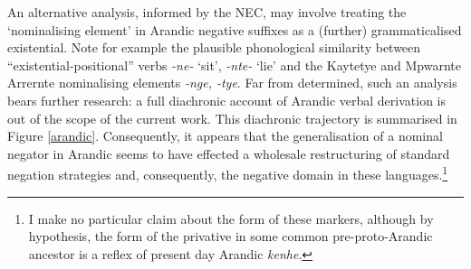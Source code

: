 \documentclass[usenames,dvipsnames,11pt]{article}
\begin{document}
{{	An alternative analysis, informed by the NEC, may involve treating the `nominalising element' in Arandic negative suffixes as a (further) grammaticalised existential. Note for example the plausible phonological similarity between ``existential-positional'' verbs \textit{-ne-} `sit', \textit{-nte-} `lie' and the Kaytetye and Mpwarnte Arrernte nominalising elements \textit{-nge, -tye}. Far from determined, such an analysis bears further research: a full diachronic account of Arandic verbal derivation is out of the scope of the current work.} This diachronic trajectory is summarised in Figure \ref{arandic}. %
Consequently, it appears that the generalisation of a nominal negator in Arandic seems to have effected a wholesale restructuring of standard negation strategies and, consequently, the negative domain in these languages.\footnote{I make no particular claim about the form of these markers, although by hypothesis, the form of the privative in some common pre-proto-Arandic ancestor is a reflex of present day Arandic \textit{\textdblhyphen kenhe}.}
\begin{figure}[H]
	\caption{Summary of reconstructed changes in the Arandic negative domain in terms of NEC stages $ (A,B,C) $}\label{arandic}
	\begin{subfigure}{.3\textwidth}

\end{subfigure}
\end{figure}}
\end{document}
